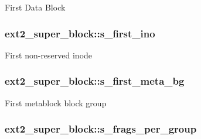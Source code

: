 First Data Block \hypertarget{structext2__super__block_a0d3a8f3c14e0a971750cfdfbc2cf6070}{
\subsubsection[{s\-\_\-first\-\_\-ino}]{ ext2\-\_\-super\-\_\-block\-::s\-\_\-first\-\_\-ino}}\label{structext2__super__block_a0d3a8f3c14e0a971750cfdfbc2cf6070}
First non-\/reserved inode \hypertarget{structext2__super__block_a436c7c8af548ade7f8045e88c2861d61}{
\subsubsection[{s\-\_\-first\-\_\-meta\-\_\-bg}]{ ext2\-\_\-super\-\_\-block\-::s\-\_\-first\-\_\-meta\-\_\-bg}}\label{structext2__super__block_a436c7c8af548ade7f8045e88c2861d61}
First metablock block group \hypertarget{structext2__super__block_a6370cd7307aa833951c40fcc3f941b61}{
\subsubsection[{s\-\_\-frags\-\_\-per\-\_\-group}]{ ext2\-\_\-super\-\_\-block\-::s\-\_\-frags\-\_\-per\-\_\-group}}\label{structext2__super__block_a6370cd7307aa833951c40fcc3f941b61}
